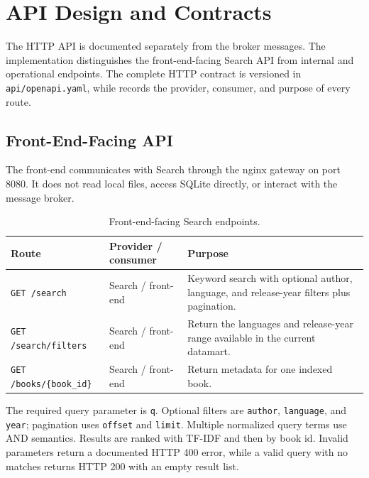 \documentclass[12pt,a4paper]{article}
\begin{document}
\section{API Design and Contracts}
\label{sec:api}
The HTTP API is documented separately from the broker messages. The implementation distinguishes
the front-end-facing Search API from internal and operational endpoints. The complete HTTP
contract is versioned in \texttt{api/openapi.yaml}, while  records
the provider, consumer, and purpose of every route.

\subsection{Front-End-Facing API}

The front-end communicates with Search through the nginx gateway on port 8080. It does not read
local files, access SQLite directly, or interact with the message broker.

\begin{table}[H]
    \centering
    \caption{Front-end-facing Search endpoints.}
    \small
    \begin{tabularx}{\textwidth}{p{} p{} X}
        \toprule
        \textbf{Route} & \textbf{Provider / consumer} & \textbf{Purpose} \\
        \midrule
        \texttt{GET /search} & Search / front-end & Keyword search with optional author, language, and release-year filters plus pagination. \\
        \texttt{GET /search/filters} & Search / front-end & Return the languages and release-year range available in the current datamart. \\
        \texttt{GET /books/\{book\_id\}} & Search / front-end & Return metadata for one indexed book. \\
        \bottomrule
    \end{tabularx}
\end{table}

The required query parameter is \texttt{q}. Optional filters are \texttt{author},
\texttt{language}, and \texttt{year}; pagination uses \texttt{offset} and \texttt{limit}.
Multiple normalized query terms use AND semantics. Results are ranked with TF-IDF and then by book
id. Invalid parameters return a documented HTTP 400 error, while a valid query with no matches
returns HTTP 200 with an empty result list.
\end{document}
